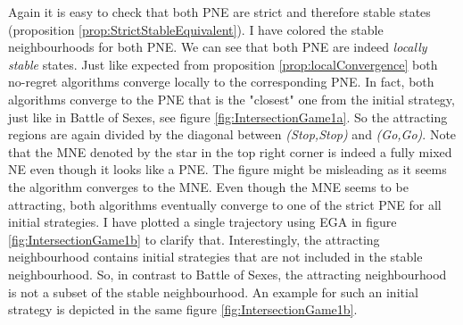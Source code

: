 Again it is easy to check that both PNE are strict and therefore stable states (proposition \ref{prop:StrictStableEquivalent}). I have colored the stable neighbourhoods for both PNE. We can see that both PNE are indeed \textit{locally stable} states. Just like expected from proposition \ref{prop:localConvergence} both no-regret algorithms converge locally to the corresponding PNE. In fact, both algorithms converge to the PNE that is the "closest" one from the initial strategy, just like in Battle of Sexes, see figure \ref{fig:IntersectionGame1a}. So the attracting regions are again divided by the diagonal between \textit{(Stop,Stop)} and \textit{(Go,Go)}. Note that the MNE denoted by the star in the top right corner is indeed a fully mixed NE even though it looks like a PNE. The figure might be misleading as it seems the algorithm converges to the MNE. Even though the MNE seems to be attracting, both algorithms eventually converge to one of the strict PNE for all initial strategies. I have plotted a single trajectory using EGA in figure \ref{fig:IntersectionGame1b} to clarify that. Interestingly, the attracting neighbourhood contains initial strategies that are not included in the stable neighbourhood. So, in contrast to Battle of Sexes, the attracting neighbourhood is not a subset of the stable neighbourhood. An example for such an initial strategy is depicted in the same figure \ref{fig:IntersectionGame1b}.

